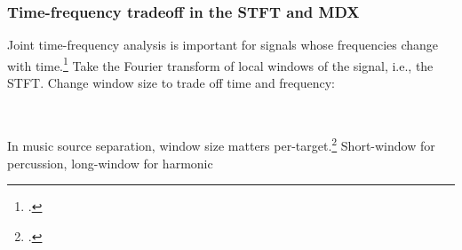 \documentclass[usenames,dvipsnames]{beamer}
\begin{document}
\begin{frame}
	\frametitle{Time-frequency tradeoff in the STFT and MDX}
	Joint time-frequency analysis is important for signals whose frequencies change with time.\footcite{gabor1946} Take the Fourier transform of local windows of the signal, i.e., the STFT. Change window size to trade off time and frequency:
	\begin{figure}[ht]
		\centering
		\vspace{-1.5em}
		\\
		\vspace{-1em}
		\vspace{-1.25em}
	\end{figure}
	In music source separation, window size matters per-target.\footcite{tftradeoff1} Short-window for percussion, long-window for harmonic
\end{frame}
\end{document}

